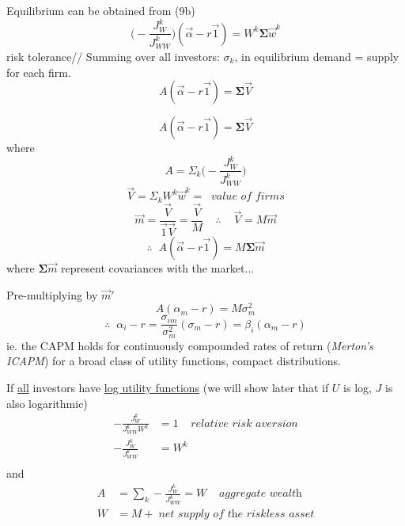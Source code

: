 \documentclass[
14pt,notheorems,hyperref={pdfauthor=whatever}
]{beamer}
\begin{document}
\begin{frame}
Equilibrium can be obtained from (9b)
\[ \Bigg(-\frac{J_W^k}{J_{WW}^k}\Bigg)(\vec{\alpha} - r\vec{1}) = W^k \bm{\Sigma} \vec{w}^k \]
risk tolerance//
\hfill\break
Summing over all investors: $\sigma_k$, in equilibrium demand = supply for each firm.\\
\[ A (\vec{\alpha} - r\vec{1}) = \bm{\Sigma}\vec{V} \]
\end{frame}

\begin{frame}
\[ A (\vec{\alpha} - r\vec{1}) = \bm{\Sigma}\vec{V} \]
where
\[ A = \Sigma_k \Bigg(-\frac{J_W^k}{J_{WW}^k}\Bigg) \]
\[ \vec{V} = \Sigma_k W^k \vec{w}^k = \;\;\textit{value of firms} \]
\[ \vec{m} = \frac{\vec{V}}{\vec{1}\vec{V}} = \frac{\vec{V}}{M} \;\;\;\;\therefore\;\;\;\; \vec{V} = M\vec{m}\]
\[ \therefore \;\; A(\vec{\alpha}-r\vec{1}) = M \bm{\Sigma}\vec{m}\]
\hfill\break
where $\bm{\Sigma}\vec{m}$ represent covariances with the market...\\
\end{frame}

\begin{frame}
Pre-multiplying by $\vec{m}'$\\
\[ A(\alpha_m-r) = M \sigma_m^2 \]
\begin{equation} \tag{11}
    \therefore \;\; \alpha_i-r = \frac{\sigma_{im}}{\sigma_m^2}(\sigma_m-r) = \beta_i (\alpha_m -r)
\end{equation}
\hfill\break
ie. the CAPM holds for continuously compounded rates of return (\textit{Merton's ICAPM}) for a broad class of utility functions, compact distributions.
\end{frame}

\begin{frame}
If \underline{all} investors have \underline{log utility functions} (we will show later that if $U$ is log, $J$ is also logarithmic)\\
\begin{align*}
    -\frac{J_W^k}{J_{WW}^k W^k} &= 1\;\;\;\;\textit{relative risk aversion}\\
    -\frac{J_W^k}{J_{WW}^k} &= W^k\\
\end{align*}
and
\begin{align*}
    A &= \sum_k-\frac{J_W^k}{J_{WW}^k} = W\;\;\;\;\textit{aggregate wealth}\\
    W &= M + \;\textit{net supply of the riskless asset}\\
\end{align*}
\end{frame}
\end{document}
